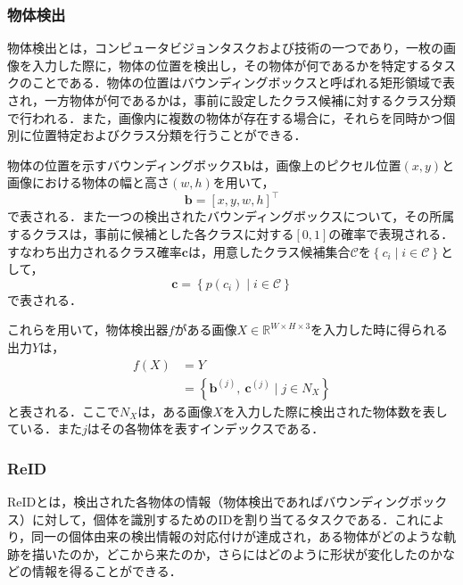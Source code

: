         \subsubsection{物体検出}
        物体検出とは，コンピュータビジョンタスクおよび技術の一つであり，一枚の画像を入力した際に，物体の位置を検出し，その物体が何であるかを特定するタスクのことである．物体の位置はバウンディングボックスと呼ばれる矩形領域で表され，一方物体が何であるかは，事前に設定したクラス候補に対するクラス分類で行われる．また，画像内に複数の物体が存在する場合に，それらを同時かつ個別に位置特定およびクラス分類を行うことができる．

        物体の位置を示すバウンディングボックス$\bm{b}$は，画像上のピクセル位置$(x, y)$と画像における物体の幅と高さ$(w,h)$を用いて，
        \begin{equation}
            \label{eq:bounding_box}
            \bm{b} = \left[x, y, w, h\right]^{\top}
        \end{equation}
        で表される．また一つの検出されたバウンディングボックスについて，その所属するクラスは，事前に候補とした各クラスに対する$[0, 1]$の確率で表現される．すなわち出力されるクラス確率$\bm{c}$は，用意したクラス候補集合$\mathcal{C}$を$\left\{c_i \mid i \in \mathcal{C}\right\}$として，
        \begin{equation}
            \label{eq:class_probability}
            \bm{c} = \left\{p(c_i) \mid i \in \mathcal{C}\right\}
        \end{equation}
        で表される．

        これらを用いて，物体検出器$f$がある画像$X \in \mathbb{R}^{W \times H \times 3}$を入力した時に得られる出力$Y$は，
        \begin{equation}
            \label{eq:object_detection}
            \begin{aligned}
                f(X) &= Y
                \\ &= \left\{\bm{b}^{(j)}, ~\bm{c}^{(j)} \mid j \in N_X\right\}
            \end{aligned}
        \end{equation}
        と表される．ここで$N_X$は，ある画像$X$を入力した際に検出された物体数を表している．また$j$はその各物体を表すインデックスである．

        \subsubsection{ReID}
        ReIDとは，検出された各物体の情報（物体検出であればバウンディングボックス）に対して，個体を識別するためのIDを割り当てるタスクである．これにより，同一の個体由来の検出情報の対応付けが達成され，ある物体がどのような軌跡を描いたのか，どこから来たのか，さらにはどのように形状が変化したのかなどの情報を得ることができる．


